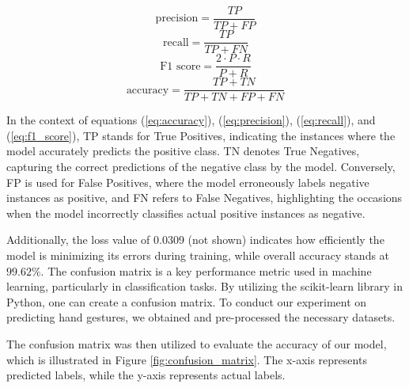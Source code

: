 \begin{equation}
	\text{precision} = \frac{TP}{TP + FP}
	\label{eq:precision}
\end{equation}
\begin{equation}
	\text{recall} = \frac{TP}{TP + FN}
	\label{eq:recall}
\end{equation}
\begin{equation}
	\text{F1 score} = \frac{2 \cdot P \cdot R}{P + R}
	\label{eq:f1_score}
\end{equation}
\begin{equation}
	\text{accuracy} = \frac{TP + TN}{TP + TN + FP + FN}
	\label{eq:accuracy}
\end{equation}

In the context of equations (\ref{eq:accuracy}), (\ref{eq:precision}), (\ref{eq:recall}), and (\ref{eq:f1_score}), TP stands for True Positives, indicating the instances where the model accurately predicts the positive class. TN denotes True Negatives, capturing the correct predictions of the negative class by the model. Conversely, FP is used for False Positives, where the model erroneously labels negative instances as positive, and FN refers to False Negatives, highlighting the occasions when the model incorrectly classifies actual positive instances as negative.

Additionally, the loss value of 0.0309 (not shown) indicates how efficiently the model is minimizing its errors during training, while overall accuracy stands at $99.62\%$. 
The confusion matrix is a key performance metric used in machine learning, particularly in classification tasks. By utilizing the scikit-learn library in Python, one can create a confusion matrix. To conduct our experiment on predicting hand gestures, we obtained and pre-processed the necessary datasets.

The confusion matrix was then utilized to evaluate the accuracy of our model, which is illustrated in Figure \ref{fig:confusion_matrix}. The x-axis represents predicted labels, while the y-axis represents actual labels. 


